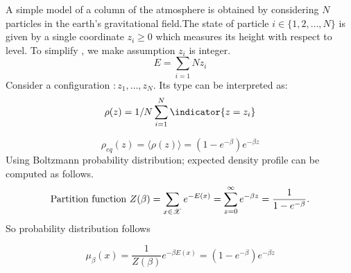 \documentclass[letterpaper,english,12pt]{article}
\begin{document}
 \begin{exmp}
 
 A simple model of a column of the atmosphere is obtained by considering $N$ particles in the earth's gravitational field.The state of particle $i \in \lbrace 1,2, \dots, N \rbrace $ is given by a single coordinate $z_i\geq 0$ which measures its height with respect to level. To simplify , we make assumption $z_i$ is integer.
 \begin{equation}
     E=\sum_{i=1}{N}z_i
 \end{equation}
 Consider a configuration $:{z_1,\dots,z_N}$. Its type can be interpreted as:
 \begin{equation}
   \rho(z) = \displaystyle 1/N\sum_{i=1}^{N}\indicator{z=z_i}  
 \end{equation}
 
 \begin{equation}
     \rho_{eq}(z)=\langle \rho(z) \rangle = (1-e^{-\beta})e^{-\beta z}
 \end{equation}
 Using Boltzmann probability distribution; expected density profile can be computed as follows.
 \begin{equation}
 \text{Partition function   } \label{pf}
	Z(\beta)= \sum_{x \in \mathscr{X}}^{} e^{-E(x)}
 	=\sum_{z=0}^{\infty} e^{-\beta z} = \frac{1}{1-e^{-\beta}}. 
 \end{equation}
 So probability distribution follows
 
 \begin{equation}
 	\mu_{\beta}(x) = \frac{1}{Z(\beta)}e^{-\beta E(x)} = (1-e^{-\beta})e^{-\beta z}
 \end{equation}
 

\end{exmp}
\end{document}
